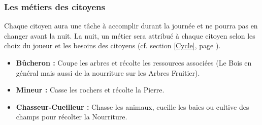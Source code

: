 \documentclass[a4paper]{memoir}
\begin{document}
				\subsubsection{Les métiers des citoyens}
					\label{Metier}
					Chaque citoyen aura une tâche à accomplir durant la journée et ne pourra pas en changer avant la nuit. La nuit, un métier sera attribué à chaque citoyen selon les choix du joueur et les besoins des citoyens (cf. section \ref{Cycle}, page \pageref{Cycle}).
					\begin{itemize}[label=$\bullet$]
						\item \textbf{Bûcheron :} Coupe les arbres et récolte les ressources associées (Le Bois en général mais aussi de la nourriture sur les Arbres Fruitier).
						\item \textbf{Mineur :} Casse les rochers et récolte la Pierre.
						\item \textbf{Chasseur-Cueilleur :} Chasse les animaux, cueille les baies ou cultive des champs pour récolter la Nourriture.
					\end{itemize}
\end{document}
